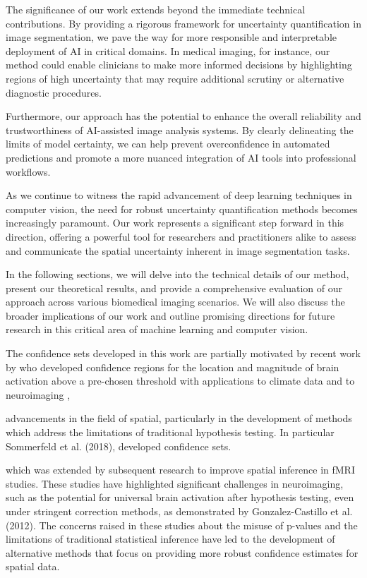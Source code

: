The significance of our work extends beyond the immediate technical contributions. By providing a rigorous framework for uncertainty quantification in image segmentation, we pave the way for more responsible and interpretable deployment of AI in critical domains. In medical imaging, for instance, our method could enable clinicians to make more informed decisions by highlighting regions of high uncertainty that may require additional scrutiny or alternative diagnostic procedures.

Furthermore, our approach has the potential to enhance the overall reliability and trustworthiness of AI-assisted image analysis systems. By clearly delineating the limits of model certainty, we can help prevent overconfidence in automated predictions and promote a more nuanced integration of AI tools into professional workflows.

As we continue to witness the rapid advancement of deep learning techniques in computer vision, the need for robust uncertainty quantification methods becomes increasingly paramount. Our work represents a significant step forward in this direction, offering a powerful tool for researchers and practitioners alike to assess and communicate the spatial uncertainty inherent in image segmentation tasks.

In the following sections, we will delve into the technical details of our method, present our theoretical results, and provide a comprehensive evaluation of our approach across various biomedical imaging scenarios. We will also discuss the broader implications of our work and outline promising directions for future research in this critical area of machine learning and computer vision.

The confidence sets developed in this work are partially motivated by recent work by \cite{Sommerfield2018} who developed confidence regions for the location and magnitude of brain activation above a pre-chosen threshold with applications to climate data and to neuroimaging \citep{Bowring2019, Bowring2020},  

 advancements in the field of spatial, particularly in the development of methods which address the limitations of traditional hypothesis testing. In particular Sommerfeld et al. (2018), developed confidence sets. 

which was extended by subsequent research to improve spatial inference in fMRI studies. These studies have highlighted significant challenges in neuroimaging, such as the potential for universal brain activation after hypothesis testing, even under stringent correction methods, as demonstrated by Gonzalez-Castillo et al. (2012). The concerns raised in these studies about the misuse of p-values and the limitations of traditional statistical inference have led to the development of alternative methods that focus on providing more robust confidence estimates for spatial data.


